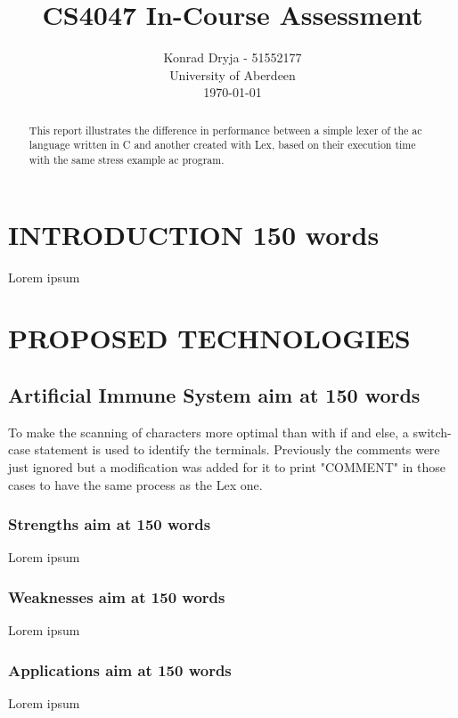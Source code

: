 \documentclass[letterpaper, 10 pt, conference]{ieeeconf}  %
\title{\LARGE \bf
CS4047 In-Course Assessment
}
\author{Konrad Dryja - 51552177 \\
  University of Aberdeen \\
  \today%
}
\begin{document}
\maketitle
\thispagestyle{empty}
\pagestyle{empty}


\begin{abstract}

This report illustrates the difference in performance between a simple lexer of the ac language written in C and another created with Lex, based on their execution time with the same stress example ac program.

\end{abstract}


\section{INTRODUCTION 150 words}

Lorem ipsum

\section{PROPOSED TECHNOLOGIES}

\subsection{Artificial Immune System aim at 150 words}
To make the scanning of characters more optimal than with if and else, a switch-case statement is used to identify the terminals. Previously the comments were just ignored but a modification was added for it to print "COMMENT" in those cases to have the same process as the Lex one.

\subsubsection{Strengths aim at 150 words} 
Lorem ipsum

\subsubsection{Weaknesses aim at 150 words}
Lorem ipsum

\subsubsection{Applications aim at 150 words}
Lorem ipsum
\end{document}
